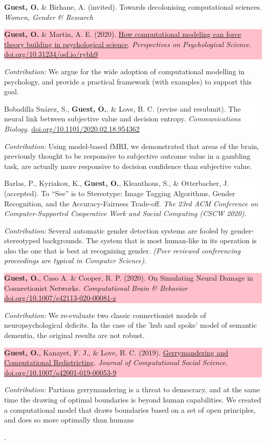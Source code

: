 \documentclass[10pt]{article}
\newcommand{\important}[2]{\colorbox{pink}{\begin{minipage}{\dimexpr\linewidth-2\fboxsep}#1
\end{minipage}}
\begin{flushright}
\begin{minipage}{0.99\dimexpr\linewidth-2\fboxsep}\small
\emph{Contribution:} #2
\end{minipage}
\end{flushright}}
\newcommand{\paper}[2]{\colorbox{white}{\begin{minipage}{\dimexpr\linewidth-2\fboxsep}#1
\end{minipage}}
\begin{flushright}
\begin{minipage}{0.99\dimexpr\linewidth-2\fboxsep}\small
\emph{Contribution:} #2
\end{minipage}
\end{flushright}}
\begin{document}
\textbf{Guest, O.} \& Birhane, A. (invited). {Towards decolonising computational sciences}. \textit{Women, Gender \& Research}
\vspace{8pt}

\important{
\textbf{Guest, O.} \& Martin, A. E. (2020).  \href{https://doi.org/10.31234/osf.io/rybh9}{How computational modeling can force theory building in psychological science}. \textit{Perspectives on Psychological Science}. \href{https://doi.org/10.31234/osf.io/rybh9}{doi.org/10.31234/osf.io/rybh9}}
{We argue for the wide adoption of computational modelling in psychology, and provide a practical framework (with examples) to support this goal.}



\paper{Bobadilla Suárez, S., \textbf{Guest, O.}, \& Love, B. C. (revise and resubmit).  {The neural link between subjective value and decision entropy}. \textit{Communications Biology}.
\newline
\href{https://doi.org/10.1101/2020.02.18.954362}{doi.org/10.1101/2020.02.18.954362}}
{Using model-based fMRI, we demonstrated that areas of the brain, previously thought to be responsive to subjective outcome value in a gambling task, are actually more responsive to decision confidence than subjective value.}

\paper{Barlas, P., Kyriakou, K., \textbf{Guest, O.}, Kleanthous, S., \& Otterbacher, J. (accepted). {To ``See'' is to Stereotype: Image Tagging Algorithms, Gender Recognition, and the Accuracy-Fairness Trade-off}. \textit{The 23rd ACM Conference on Computer-Supported Cooperative Work and Social Computing (CSCW 2020)}.}{Several automatic gender detection systems are fooled by gender-stereotyped backgrounds. The system that is most human-like in its operation is also the one that is best at recognizing gender. \emph{(Peer reviewed conferencing proceedings are typical in Computer Science)}.}

\important{
\textbf{Guest, O.}, Caso A. \& Cooper, R. P. (2020).  {On Simulating Neural Damage in Connectionist Networks}. \textit{Computational Brain \& Behavior}
 \href{https://doi.org/10.1007/s42113-020-00081-z}{doi.org/10.1007/s42113-020-00081-z}}
{We re-evaluate two classic connectionist models of neuropsychological deficits. In the case of the 'hub and spoke' model of semantic dementia, the original results are not robust.} 

\vspace{8pt}

\important{\textbf{Guest, O.}, Kanayet, F. J., \& Love, B. C. (2019). \href{https://dx.doi.org/10.1007/s42001-019-00053-9}{Gerrymandering and Computational Redistricting}. \textit{Journal of Computational Social Science}. 
\href{https://dx.doi.org/10.1007/s42001-019-00053-9}{doi.org/10.1007/s42001-019-00053-9}}
{Partisan gerrymandering is a threat to democracy, and at the same time the drawing of optimal boundaries is beyond human capabilities. We created a computational model that draws boundaries based on a set of open principles, and does so more optimally than humans}.
\end{document}
